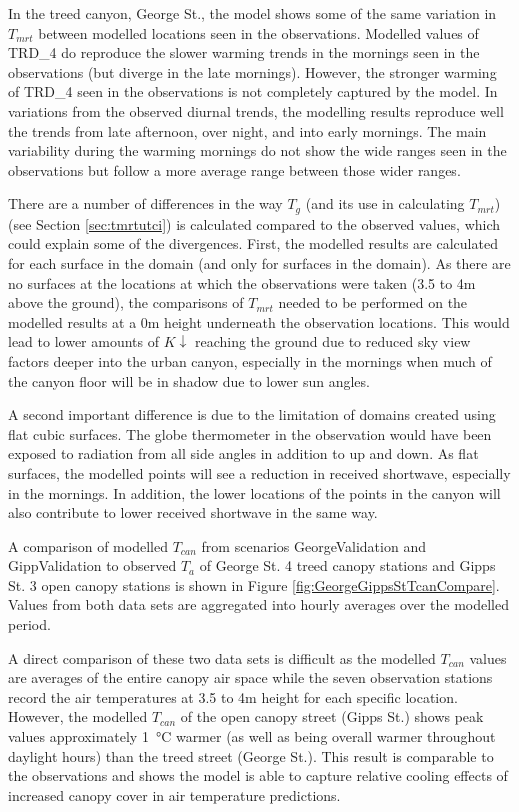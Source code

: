 \documentclass[final,3p,times,authoryear]{elsarticle}
\begin{document}
In the treed canyon, George St., the model shows some of the same variation in $T_{mrt}$ between modelled locations seen in the observations. Modelled values of TRD\_4 do reproduce the slower warming trends in the mornings seen in the observations (but diverge in the late mornings). However, the stronger warming of TRD\_4 seen in the observations is not completely captured by the model. In variations from the observed diurnal trends, the modelling results reproduce well the trends from late afternoon, over night, and into early mornings. The main variability during the warming mornings do not show the wide ranges seen in the observations but follow a more average range between those wider ranges. 

There are a number of differences in the way $T_{g}$ (and its use in calculating $T_{mrt}$) (see Section \ref{sec:tmrtutci}) is calculated compared to the observed values, which could explain some of the divergences. First, the modelled results are calculated for each surface in the domain (and only for surfaces in the domain). As there are no surfaces at the locations at which the observations were taken (3.5 to 4m above the ground), the comparisons of $T_{mrt}$ needed to be performed on the modelled results at a 0m height underneath the observation locations. This would lead to lower amounts of $K\downarrow$ reaching the ground due to reduced sky view factors deeper into the urban canyon, especially in the mornings when much of the canyon floor will be in shadow due to lower sun angles.

A second important difference is due to the limitation of domains created using flat cubic surfaces. The globe thermometer in the observation would have been exposed to radiation from all side angles in addition to up and down. As flat surfaces, the modelled points will see a reduction in received shortwave, especially in the mornings. In addition, the lower locations of the points in the canyon will also contribute to lower received shortwave in the same way.


A comparison of modelled $T_{can}$ from scenarios GeorgeValidation and GippValidation to observed $T_{a}$ of George St. 4 treed canopy stations and Gipps St. 3 open canopy stations is shown in Figure \ref{fig:GeorgeGippsStTcanCompare}. Values from both data sets are aggregated into hourly averages over the modelled period. 

A direct comparison of these two data sets is difficult as the modelled $T_{can}$ values are averages of the entire canopy air space while the seven observation stations record the air temperatures at 3.5 to 4m height for each specific location. However, the modelled $T_{can}$ of the open canopy street (Gipps St.) shows peak values approximately 1\SI{}{\degreeCelsius} warmer (as well as being overall warmer throughout daylight hours) than the treed street (George St.). This result is comparable to the \cite{Coutts2015} observations and shows the model is able to capture relative cooling effects of increased canopy cover in air temperature predictions.
\end{document}
